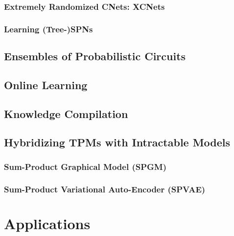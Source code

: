 			\subsubsection{Extremely Randomized CNets: XCNets} %

			\subsubsection{Learning (Tree-)SPNs} %

		\subsection{Ensembles of Probabilistic Circuits} %

		\subsection{Online Learning} %

		\subsection{Knowledge Compilation} %

		\subsection{Hybridizing TPMs with Intractable Models} %

			\subsubsection{Sum-Product Graphical Model (SPGM)} %

			\subsubsection{Sum-Product Variational Auto-Encoder (SPVAE)} %

	\section{Applications} %

